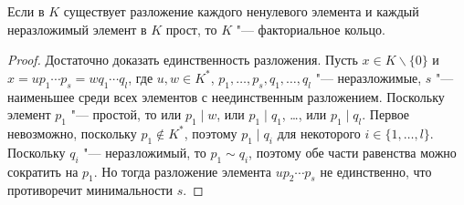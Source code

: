\begin{proposition}
	Если в $K$ существует разложение каждого ненулевого элемента и каждый неразложимый элемент в $K$ прост, то $K$ "--- факториальное кольцо.
\end{proposition}

\begin{proof}
	Достаточно доказать единственность разложения. Пусть $x \in K\backslash\{0\}$ и $x = up_1\dotsm p_s = wq_1\dotsm q_l$, где $u, w \in K^*$, $p_1, \dotsc, p_s, q_1, \dotsc, q_l$ "--- неразложимые, $s$ "--- наименьшее среди всех элементов с неединственным разложением. Поскольку элемент $p_1$ "--- простой, то или $p_1\mid w$, или $p_1 \mid q_1$, \dots, или $p_1 \mid q_l$. Первое невозможно, поскольку $p_1 \not\in K^*$, поэтому $p_1 \mid q_i$ для некоторого $i \in \{1, \dotsc, l\}$. Поскольку $q_i$ "--- неразложимый, то $p_1 \sim q_i$, поэтому обе части равенства можно сократить на $p_1$. Но тогда разложение элемента $up_2\dotsm p_s$ не единственно, что противоречит минимальности $s$.
\end{proof}
